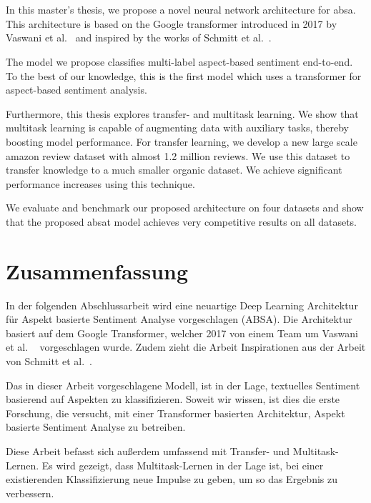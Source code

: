 \chapter{\abstractname}

In this master's thesis, we propose a novel neural network architecture for \acrfull{absa}. This architecture is based on the Google transformer introduced in 2017 by Vaswani et al.~\cite{Vaswani2017} and inspired by the works of Schmitt et al.~\cite{Schmitt2018}.
\medskip

The model we propose classifies multi-label aspect-based sentiment end-to-end. To the best of our knowledge, this is the first model which uses a transformer for aspect-based sentiment analysis.
\medskip

Furthermore, this thesis explores transfer- and multitask learning. We show that multitask learning is capable of augmenting data with auxiliary tasks, thereby boosting model performance. For transfer learning, we develop a new large scale amazon review dataset with almost 1.2 million reviews. We use this dataset to transfer knowledge to a much smaller organic dataset. We achieve significant performance increases using this technique.
\medskip

We evaluate and benchmark our proposed architecture on four datasets and show that the proposed \acrfull{absat} model achieves very competitive results on all datasets.


\chapter{Zusammenfassung}

In der folgenden Abschlussarbeit wird eine neuartige Deep Learning Architektur für Aspekt basierte Sentiment Analyse vorgeschlagen {(ABSA)}. Die Architektur basiert auf dem Google Transformer, welcher 2017 von einem Team um Vaswani et al. ~\cite{Vaswani2017} vorgeschlagen wurde. Zudem zieht die Arbeit Inspirationen aus der Arbeit von Schmitt et al.~\cite{Schmitt2018}.
\medskip

Das in dieser Arbeit vorgeschlagene Modell, ist in der Lage, textuelles Sentiment basierend auf Aspekten zu klassifizieren. Soweit wir wissen, ist dies die erste Forschung, die versucht, mit einer Transformer basierten Architektur, Aspekt basierte Sentiment Analyse zu betreiben.
\medskip

Diese Arbeit befasst sich außerdem umfassend mit Transfer- und Multitask-Lernen. Es wird gezeigt, dass Multitask-Lernen in der Lage ist, bei einer existierenden Klassifizierung neue Impulse zu geben, um so das Ergebnis zu verbessern. 

